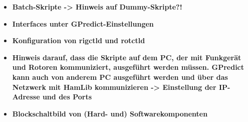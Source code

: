 \begin{itemize}
	\parskip0pt
	\item \textbf{Batch-Skripte -> Hinweis auf Dummy-Skripte?!}
	\item \textbf{Interfaces unter GPredict-Einstellungen}
	\item \textbf{Konfiguration von rigctld und rotctld}
	\item \textbf{Hinweis darauf, dass die Skripte auf dem PC, der mit Funkgerät und Rotoren kommuniziert, ausgeführt werden müssen. GPredict kann auch von anderem PC ausgeführt werden und über das Netzwerk mit HamLib kommunizieren -> Einstellung der IP-Adresse und des Ports}
	\item \textbf{Blockschaltbild von (Hard- und) Softwarekomponenten}
\end{itemize}



